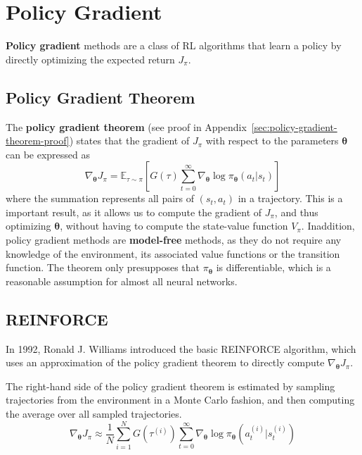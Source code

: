 \documentclass[12pt]{report}
\theoremstyle{definition}
\theoremstyle{remark}
\begin{document}
\section{Policy Gradient}
\textbf{Policy gradient} methods are a class of RL algorithms that learn a policy by directly optimizing the expected return $J_\pi$.

\subsection{Policy Gradient Theorem}
The \textbf{policy gradient theorem} (see proof in Appendix~\ref{sec:policy-gradient-theorem-proof}) states that the gradient of $J_\pi$ with respect to the parameters $\boldsymbol{\theta}$ can be expressed as
\begin{equation}\label{eq:policy-gradient-theorem}
    \nabla_{\boldsymbol{\theta}} J_\pi =  \mathbb{E}_{\tau\sim\pi}\left[G(\tau) \sum_{t=0}^{\infty} \nabla_{\boldsymbol{\theta}} \log \pi_{\boldsymbol{\theta}}(a_t | s_t)\right]
\end{equation}
where the summation represents all pairs of $(s_t, a_t)$ in a trajectory.
This is a important result, as it allows us to compute the gradient of $J_\pi$, and thus optimizing $\boldsymbol{\theta}$, without having to compute the state-value function $V_\pi$. Inaddition, policy gradient methods are \textbf{model-free} methods, as they do not require any knowledge of the environment, its associated value functions or the transition function. The theorem only presupposes that $\pi_{\boldsymbol{\theta}}$ is differentiable, which is a reasonable assumption for almost all neural networks.

\subsection{\textsc{REINFORCE}}
In 1992, Ronald J. Williams introduced the basic \textsc{REINFORCE} algorithm, which uses an approximation of the policy gradient theorem to directly compute $\nabla_{\boldsymbol{\theta}} J_\pi$.~\cite{williams_simple_1992}

The right-hand side of the policy gradient theorem is estimated by sampling trajectories from the environment in a Monte Carlo fashion, and then computing the average over all sampled trajectories.
\begin{equation}
    \nabla_{\boldsymbol{\theta}} J_\pi \approx \frac{1}{N} \sum_{i=1}^{N} G(\tau^{(i)}) \sum_{t=0}^{\infty} \nabla_{\boldsymbol{\theta}} \log \pi_{\boldsymbol{\theta}}(a_t^{(i)} | s_t^{(i)})
\end{equation}
\end{document}

